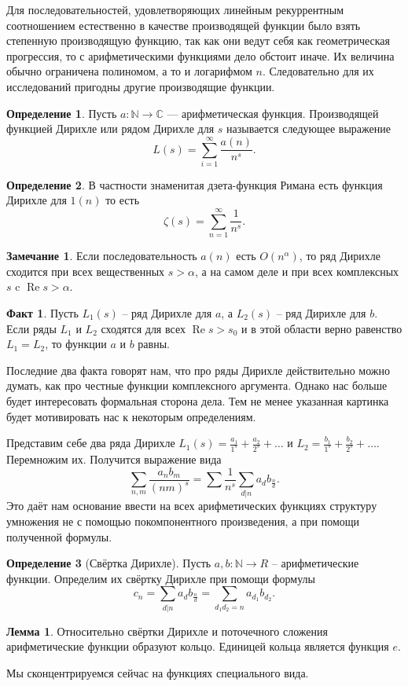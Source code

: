 \documentclass[10pt,a4paper,oneside]{book}
\theoremstyle{definition}
\newtheorem*{rem}{Замечание}
\newtheorem{defn}{Определение}
\newtheorem*{fact}{Факт}
\newtheorem{lem}{Лемма}
\newcommand{\mb}[1]{\mathbb{#1}}
\newcommand{\re}{\operatorname{Re}}
\def\dfn{\begin{defn}}
\def\edfn{\end{defn}}
\def\lm{\begin{lem}}
\def\elm{\end{lem}}
\def\rm{\begin{rem}}
\def\erm{\end{rem}}
\def\fct{\begin{fact}}
\def\efct{\end{fact}}
\begin{document}
Для последовательностей, удовлетворяющих линейным рекуррентным соотношением естественно в качестве производящей функции было взять степенную производящую функцию, так как они ведут себя как геометрическая прогрессия, то с арифметическими функциями дело обстоит иначе. Их величина обычно ограничена полиномом, а то и логарифмом $n$. Следовательно для их исследований пригодны другие производящие функции.

\dfn Пусть $a\colon \mb N\to \mb C$ --- арифметическая функция. Производящей функцией Дирихле или рядом Дирихле для $s$ называется следующее выражение
$$L(s)=\sum_{i=1}^{\infty} \frac{a(n)}{n^s}.$$ 
\edfn

\dfn В частности знаменитая дзета-функция Римана есть функция Дирихле для $1(n)$ то есть
$$\zeta(s)=\sum_{n=1}^{\infty}\frac{1}{n^s}.$$
\edfn

\rm Если последовательность $a(n)$ есть $O(n^{\alpha})$, то ряд Дирихле сходится при всех вещественных $s>\alpha$, а на самом деле и при всех комплексных $s$ c $\re s>\alpha$.
\erm

\fct Пусть $L_1(s)$ -- ряд Дирихле для $a$, а $L_2(s)$ -- ряд Дирихле для $b$. Если ряды $L_1$ и $L_2$ сходятся для всех $\re s>s_0$ и в этой области верно равенство $L_1=L_2$, то функции $a$ и $b$ равны.
\efct

Последние два факта говорят нам, что про ряды Дирихле действительно можно думать, как про честные функции комплексного аргумента. Однако нас больше будет интересовать формальная сторона дела. Тем не менее указанная картинка будет мотивировать нас к некоторым определениям.

Представим себе два ряда Дирихле $L_1(s)=\frac{a_1}{1^s}+\frac{a_2}{2^s}+\dots$ и $L_2=\frac{b_1}{1^s}+\frac{b_2}{2^s}+\dots$. Перемножим их. Получится выражение вида 
$$\sum_{n,m} \frac{a_nb_m}{(nm)^s}=\sum \frac{1}{n^s}\sum_{d|n}a_db_{\frac{n}{d}}.$$
Это даёт нам основание ввести на всех арифметических функциях структуру умножения не с помощью покомпонентного произведения, а при помощи полученной формулы.

\dfn[Свёртка Дирихле] Пусть $a,b\colon \mb N \to R$ -- арифметические функции. Определим их свёртку Дирихле при помощи формулы $$c_n=\sum_{d|n}a_db_{\frac{n}{d}}=\sum_{d_1d_2=n}a_{d_1}b_{d_2}.$$
\edfn

\lm Относительно свёртки Дирихле и поточечного сложения арифметические функции образуют кольцо. Единицей кольца является функция $e$.
\elm

Мы сконцентрируемся сейчас на функциях специального вида.
\end{document}
